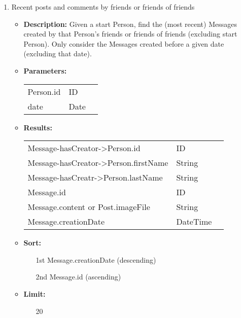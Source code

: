 {\begin{enumerate}
    \item Recent posts and comments by friends or friends of friends
        \begin{itemize}
            \item \textbf{Description:}
              Given a start Person, find the (most recent) Messages created
                by that Person's friends or friends of friends (excluding start
                Person). Only consider the Messages created before a given
                date (excluding that date).  
            \item \textbf{Parameters:} \\
                \begin{tabular}{lll}
                    Person.id 	 						& ID & \parbox[t]{20cm}{\par \strut} \\
                    date 		 						& Date & \parbox[t]{20cm}{\par \strut} \\
                \end{tabular}		
            \item \textbf{Results:} \\
                \begin{tabular}{lll}
                  Message-hasCreator->Person.id 	 								& ID & \parbox[t]{20cm}{\par \strut} \\
                  Message-hasCreator->Person.firstName 	 						& String & \parbox[t]{20cm}{\par \strut} \\
                  Message-hasCreatr->Person.lastName 	 						& String & \parbox[t]{20cm}{\par \strut} \\
                    Message.id  	 						& ID & \parbox[t]{20cm}{\par \strut} \\
                    Message.content or Post.imageFile	& String & \parbox[t]{20cm}{\par \strut} \\
                    Message.creationDate 	 	& DateTime & \parbox[t]{20cm}{\par \strut} \\
                \end{tabular}		
             \item \textbf{Sort:}
                  \begin{itemize}
                    \item[1st] Message.creationDate (descending)
                    \item[2nd] Message.id (ascending)
                  \end{itemize}
             \item \textbf{Limit:}
                  \begin{itemize}
                    \item[] 20
                  \end{itemize}
        \end{itemize}


\end{enumerate}}
